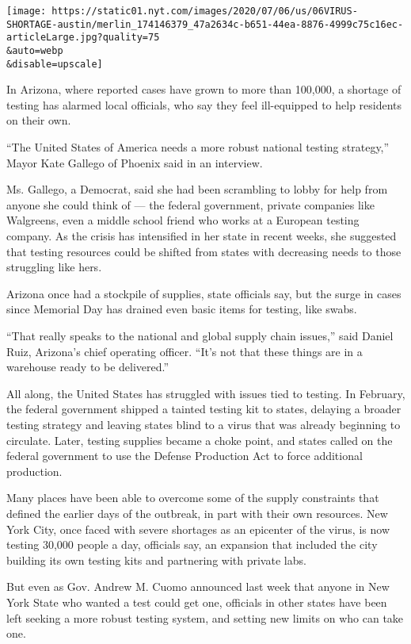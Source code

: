 \texttt{[image: https://static01.nyt.com/images/2020/07/06/us/06VIRUS-SHORTAGE-austin/merlin\_174146379\_47a2634c-b651-44ea-8876-4999c75c16ec-articleLarge.jpg?quality=75\\\&auto=webp\\\&disable=upscale]}

In Arizona, where reported cases have grown to more than 100,000, a
shortage of testing has alarmed local officials, who say they feel
ill-equipped to help residents on their own.

``The United States of America needs a more robust national testing
strategy,'' Mayor Kate Gallego of Phoenix said in an interview.

Ms. Gallego, a Democrat, said she had been scrambling to lobby for help
from anyone she could think of --- the federal government, private
companies like Walgreens, even a middle school friend who works at a
European testing company. As the crisis has intensified in her state in
recent weeks, she suggested that testing resources could be shifted from
states with decreasing needs to those struggling like hers.

Arizona once had a stockpile of supplies, state officials say, but the
surge in cases since Memorial Day has drained even basic items for
testing, like swabs.

``That really speaks to the national and global supply chain issues,''
said Daniel Ruiz, Arizona's chief operating officer. ``It's not that
these things are in a warehouse ready to be delivered.''

All along, the United States has struggled with issues tied to testing.
In February, the federal government shipped a tainted testing kit to
states, delaying a broader testing strategy and leaving states blind to
a virus that was already beginning to circulate. Later, testing supplies
became a choke point, and states called on the federal government to use
the Defense Production Act to force additional production.

Many places have been able to overcome some of the supply constraints
that defined the earlier days of the outbreak, in part with their own
resources. New York City, once faced with severe shortages as an
epicenter of the virus, is now testing 30,000 people a day, officials
say, an expansion that included the city building its own testing kits
and partnering with private labs.

But even as Gov. Andrew M. Cuomo announced last week that anyone in New
York State who wanted a test could get one, officials in other states
have been left seeking a more robust testing system, and setting new
limits on who can take one.

